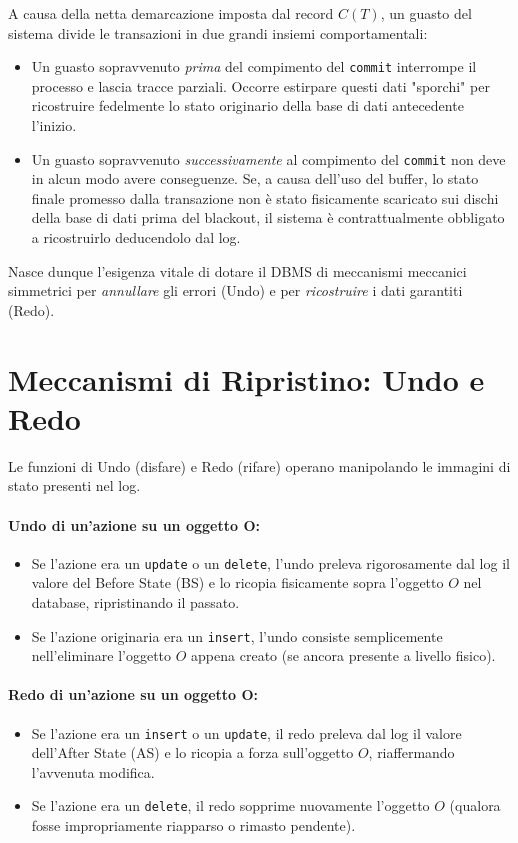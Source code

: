 A causa della netta demarcazione imposta dal record $C(T)$, un guasto del sistema divide le transazioni in due grandi insiemi comportamentali:
\begin{itemize}
    \item Un guasto sopravvenuto \textit{prima} del compimento del \texttt{commit} interrompe il processo e lascia tracce parziali. Occorre estirpare questi dati "sporchi" per ricostruire fedelmente lo stato originario della base di dati antecedente l'inizio.
    \item Un guasto sopravvenuto \textit{successivamente} al compimento del \texttt{commit} non deve in alcun modo avere conseguenze. Se, a causa dell'uso del buffer, lo stato finale promesso dalla transazione non è stato fisicamente scaricato sui dischi della base di dati prima del blackout, il sistema è contrattualmente obbligato a ricostruirlo deducendolo dal log.
\end{itemize}

Nasce dunque l'esigenza vitale di dotare il DBMS di meccanismi meccanici simmetrici per \textit{annullare} gli errori (Undo) e per \textit{ricostruire} i dati garantiti (Redo).

\section{Meccanismi di Ripristino: Undo e Redo}

Le funzioni di Undo (disfare) e Redo (rifare) operano manipolando le immagini di stato presenti nel log.
\paragraph{Undo di un'azione su un oggetto O:}
\begin{itemize}
    \item Se l'azione era un \texttt{update} o un \texttt{delete}, l'undo preleva rigorosamente dal log il valore del Before State (BS) e lo ricopia fisicamente sopra l'oggetto $O$ nel database, ripristinando il passato.
    \item Se l'azione originaria era un \texttt{insert}, l'undo consiste semplicemente nell'eliminare l'oggetto $O$ appena creato (se ancora presente a livello fisico).
\end{itemize}

\paragraph{Redo di un'azione su un oggetto O:}
\begin{itemize}
    \item Se l'azione era un \texttt{insert} o un \texttt{update}, il redo preleva dal log il valore dell'After State (AS) e lo ricopia a forza sull'oggetto $O$, riaffermando l'avvenuta modifica.
    \item Se l'azione era un \texttt{delete}, il redo sopprime nuovamente l'oggetto $O$ (qualora fosse impropriamente riapparso o rimasto pendente).
\end{itemize}

